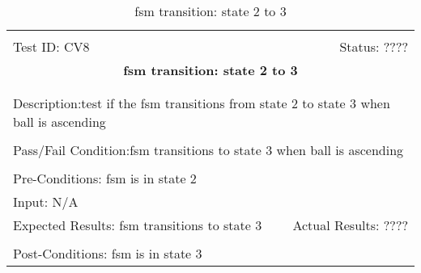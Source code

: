 \documentclass[11pt]{article}
\begin{document}
\begin{center}
\begin{table}[H]
\begin{tabular}{|l r|}\hline&\\[-2mm]
	Test ID: CV8	&Status: ????\\[-3mm]
	\multicolumn{2}{|c|}{\textbf{\large{fsm transition: state 2 to 3}}}\\&\\\hline&\\[-3mm]
	\multicolumn{2}{|p{\textwidth}|}{Description:test if the fsm transitions from state 2 to state 3 when ball is ascending}\\[1mm]\hline&\\[-3mm]
	\multicolumn{2}{|p{\textwidth}|}{Pass/Fail Condition:fsm transitions to state 3 when ball is ascending }\\[1mm]\hline&\\[-3mm]
	\multicolumn{2}{|p{\textwidth}|}{Pre-Conditions: fsm is in state 2}\\[4mm]
	\multicolumn{2}{|p{\textwidth}|}{Input: N/A}\\[2mm]\hline
	\multicolumn{1}{|p{0.49\textwidth}}{Expected Results: fsm transitions to state 3}	&\multicolumn{1}{|p{0.45\textwidth}|}{Actual Results: ????}\\\hline&\\[-3mm]
	\multicolumn{2}{|p{\textwidth}|}{Post-Conditions: fsm is in state 3}\\\hline
\end{tabular}
\caption{fsm transition: state 2 to 3}
\end{table}
\end{center}
\end{document}
